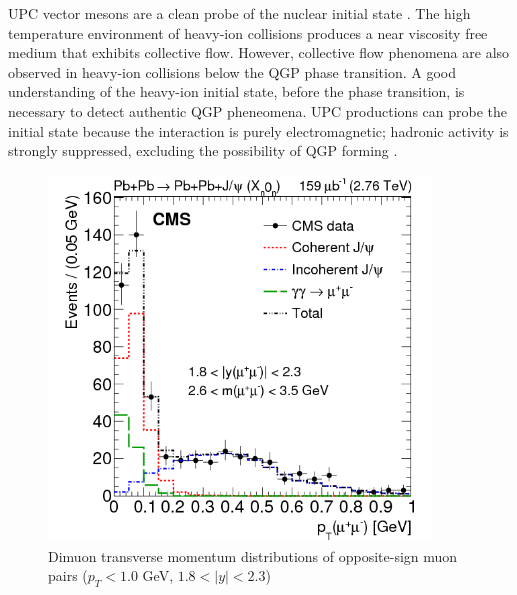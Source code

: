 UPC vector mesons are a clean probe of the nuclear initial state \cite{Aktas:2006qs}\cite{oniaPol}. The high temperature environment of heavy-ion collisions produces a near viscosity free medium that exhibits collective flow. However, collective flow phenomena are also observed in heavy-ion collisions below the QGP phase transition. A good understanding of the heavy-ion initial state, before the phase transition, is necessary to detect authentic QGP pheneomena. UPC productions can probe the initial state because the interaction is purely electromagnetic; hadronic activity is strongly suppressed, excluding the possibility of QGP forming \cite{vmd1999}\cite{vmd2000.03}. 
\begin{figure}[h!]
\begin{centering}
\includegraphics[width=4in]{Chapter2/importfigs/patkenny_Figure_001-b.png}
\par\end{centering}
\caption{Dimuon transverse momentum distributions of opposite-sign muon pairs ($p_T<1.0$ GeV, $1.8<|y|<2.3$) \cite{Khachatryan:2016qhq} \label{fig:pk2}}
\end{figure}

